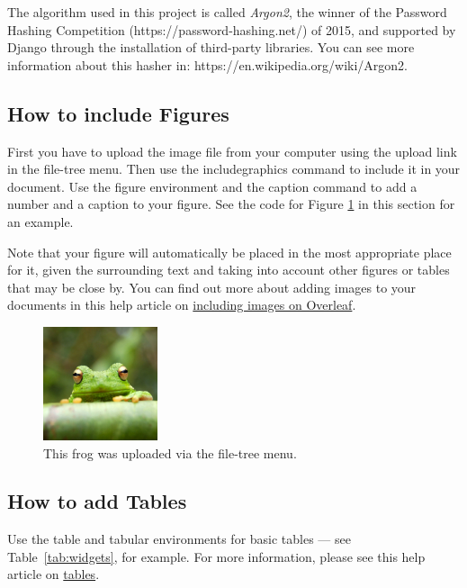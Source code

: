 The algorithm used in this project is called \textit{Argon2}, the winner of the Password Hashing Competition
(https://password-hashing.net/) of 2015, and supported by Django through the installation of third-party libraries.
You can see more information about this hasher in: https://en.wikipedia.org/wiki/Argon2.




\subsection{How to include Figures}

First you have to upload the image file from your computer using the upload link in the file-tree menu. Then use the includegraphics command to include it in your document. Use the figure environment and the caption command to add a number and a caption to your figure. See the code for Figure \ref{fig:frog} in this section for an example.

Note that your figure will automatically be placed in the most appropriate place for it, given the surrounding text and taking into account other figures or tables that may be close by. You can find out more about adding images to your documents in this help article on \href{https://www.overleaf.com/learn/how-to/Including_images_on_Overleaf}{including images on Overleaf}.

\begin{figure}
    \centering
    \includegraphics[width=0.3\textwidth]{src/frog.jpg}
    \caption{\label{fig:frog}This frog was uploaded via the file-tree menu.}
\end{figure}

\subsection{How to add Tables}

Use the table and tabular environments for basic tables --- see Table~\ref{tab:widgets}, for example. For more information, please see this help article on \href{https://www.overleaf.com/learn/latex/tables}{tables}.

